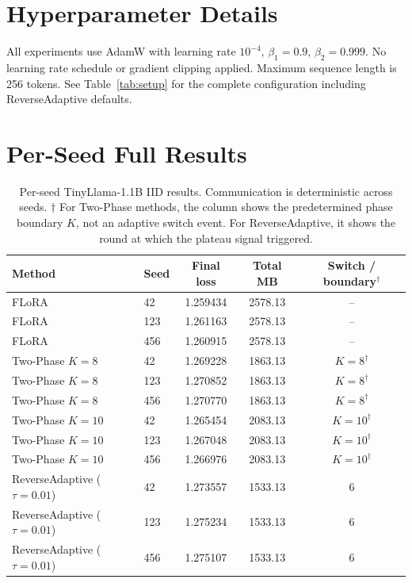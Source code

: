 \appendix
\section{Hyperparameter Details}
\label{app:hyper}
All experiments use AdamW \citep{loshchilov2019decoupled} with learning rate $10^{-4}$, $\beta_1{=}0.9$, $\beta_2{=}0.999$. No learning rate schedule or gradient clipping applied. Maximum sequence length is 256 tokens. See Table~\ref{tab:setup} for the complete configuration including ReverseAdaptive defaults.

\section{Per-Seed Full Results}
\label{app:perseed}

\begin{table}[H]
\caption{Per-seed TinyLlama-1.1B IID results. Communication is deterministic across seeds. $\dagger$ For Two-Phase methods, the column shows the predetermined phase boundary $K$, not an adaptive switch event. For ReverseAdaptive, it shows the round at which the plateau signal triggered.}
\label{tab:b1}
\begin{center}
\small
\begin{tabular}{llccc}
\toprule
Method & Seed & Final loss & Total MB & Switch / boundary$^\dagger$ \\
\midrule
FLoRA & 42 & 1.259434 & 2578.13 & -- \\
FLoRA & 123 & 1.261163 & 2578.13 & -- \\
FLoRA & 456 & 1.260915 & 2578.13 & -- \\
Two-Phase $K{=}8$ & 42 & 1.269228 & 1863.13 & $K{=}8^\dagger$ \\
Two-Phase $K{=}8$ & 123 & 1.270852 & 1863.13 & $K{=}8^\dagger$ \\
Two-Phase $K{=}8$ & 456 & 1.270770 & 1863.13 & $K{=}8^\dagger$ \\
Two-Phase $K{=}10$ & 42 & 1.265454 & 2083.13 & $K{=}10^\dagger$ \\
Two-Phase $K{=}10$ & 123 & 1.267048 & 2083.13 & $K{=}10^\dagger$ \\
Two-Phase $K{=}10$ & 456 & 1.266976 & 2083.13 & $K{=}10^\dagger$ \\
ReverseAdaptive ($\tau{=}0.01$) & 42 & 1.273557 & 1533.13 & 6 \\
ReverseAdaptive ($\tau{=}0.01$) & 123 & 1.275234 & 1533.13 & 6 \\
ReverseAdaptive ($\tau{=}0.01$) & 456 & 1.275107 & 1533.13 & 6 \\
\bottomrule
\end{tabular}
\end{center}
\end{table}

